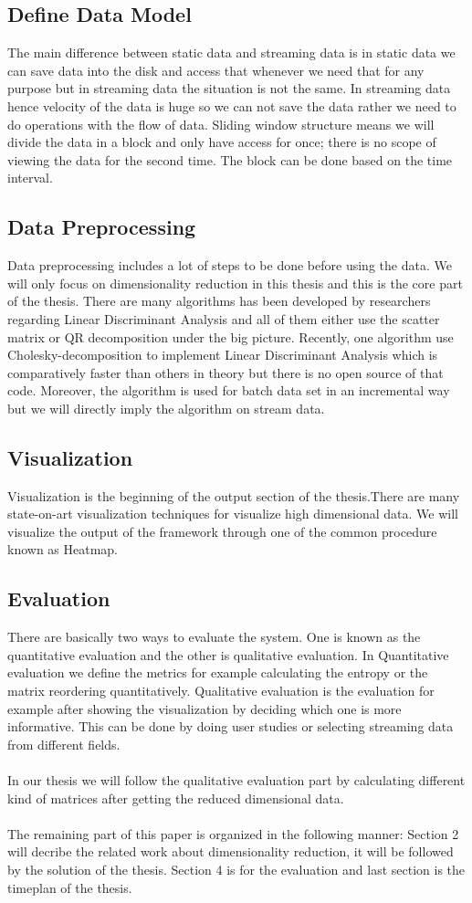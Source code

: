 \subsection{Define Data Model}
The main difference between static data and streaming data is in static data we can save data into the disk and access that whenever we need that for any purpose but in streaming data the situation is not the same. In streaming data hence velocity of the data is huge so we can not save the data rather we need to do operations with the flow of data. Sliding window structure means we will divide the data in a block and only have access for once; there is no scope of viewing the data for the second time. The block can be done based on the time interval.
\subsection{Data Preprocessing}
Data preprocessing includes a lot of steps to be done before using the data. We will only focus on dimensionality reduction in this thesis and this is the core part of the thesis. There are many algorithms has been developed by researchers regarding Linear Discriminant Analysis and all of them either use the scatter matrix or QR decomposition under the big picture. Recently, one algorithm use Cholesky-decomposition to implement Linear Discriminant Analysis which is comparatively faster than others in theory but there is no open source of that code. Moreover, the algorithm is used for batch data set in an incremental way but we will directly imply the algorithm on stream data.
\subsection{Visualization}
Visualization is the beginning of the output section of the thesis.There are many state-on-art visualization techniques for visualize high dimensional data. We will visualize the output of the framework through one of the common procedure known as Heatmap.
\subsection{Evaluation}
There are basically two ways to evaluate the system. One is known as the quantitative evaluation and the other is qualitative evaluation. In Quantitative evaluation we define the metrics for example calculating the entropy or the matrix reordering quantitatively. Qualitative evaluation is the evaluation for example after showing the visualization by deciding which one is more informative. This can be done by doing user studies or selecting streaming data from different fields.\\\\
In our thesis we will follow the qualitative evaluation part by calculating different kind of matrices after getting the reduced dimensional data.\\\\
The remaining part of this paper is organized in the following manner: Section 2 will decribe the related work about dimensionality reduction, it will be followed by the solution of the thesis. Section 4 is for the evaluation and last section is the timeplan of the thesis. 


